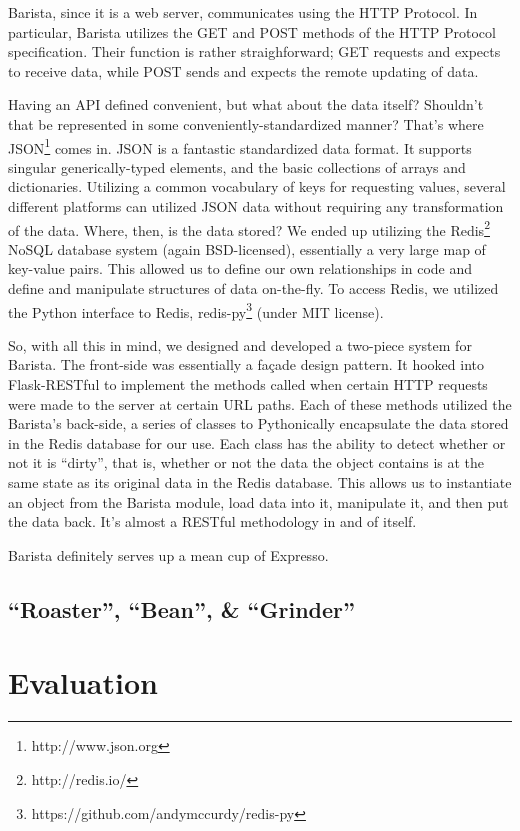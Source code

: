\documentclass{acm_proc_article-sp}
\begin{document}
Barista, since it is a web server, communicates using the HTTP Protocol. In particular, Barista utilizes the GET and POST methods of the HTTP Protocol specification. Their function is rather straighforward; GET requests and expects to receive data, while POST sends and expects the remote updating of data. 

Having an API defined convenient, but what about the data itself? Shouldn't that be represented in some conveniently-standardized manner? That's where JSON\footnote{http://www.json.org} comes in. JSON is a fantastic standardized data format. It supports singular generically-typed elements, and the basic collections of arrays and dictionaries. Utilizing a common vocabulary of keys for requesting values, several different platforms can utilized JSON data without requiring any transformation of the data. Where, then, is the data stored? We ended up utilizing the Redis\footnote{http://redis.io/} NoSQL database system (again BSD-licensed), essentially a very large map of key-value pairs. This allowed us to define our own relationships in code and define and manipulate structures of data on-the-fly. To access Redis, we utilized the Python interface to Redis, redis-py\footnote{https://github.com/andymccurdy/redis-py} (under MIT license).

So, with all this in mind, we designed and developed a two-piece system for Barista. The front-side was essentially a fa\c{c}ade design pattern. It hooked into Flask-RESTful to implement the methods called when certain HTTP requests were made to the server at certain URL paths. Each of these methods utilized the Barista's back-side, a series of classes to Pythonically encapsulate the data stored in the Redis database for our use. Each class has the ability to detect whether or not it is ``dirty'', that is, whether or not the data the object contains is at the same state as its original data in the Redis database. This allows us to instantiate an object from the Barista module, load data into it, manipulate it, and then put the data back. It's almost a RESTful methodology in and of itself.

Barista definitely serves up a mean cup of Expresso.

\subsection{``Roaster'', ``Bean'', \& ``Grinder''}
\label{subsection:roaster}


\section{Evaluation}
\end{document}
